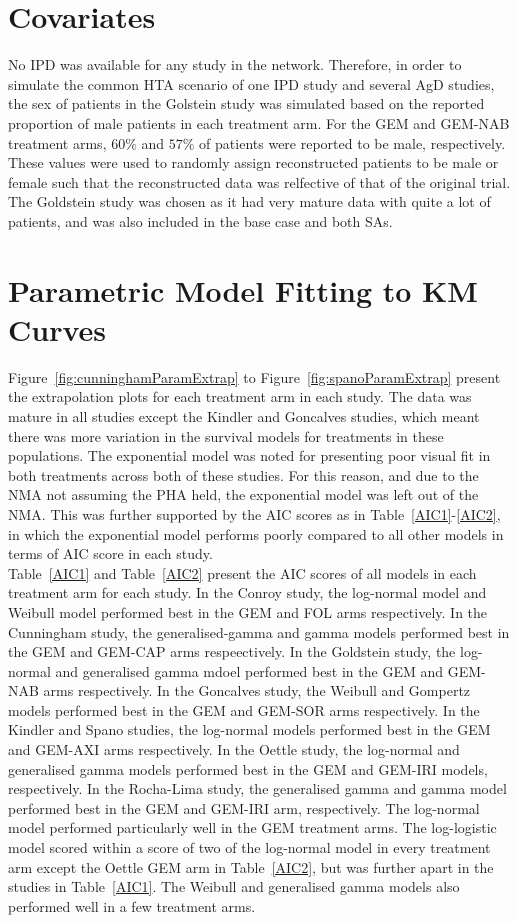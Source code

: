 \section{Covariates}
No IPD was available for any study in the network. Therefore, in order to simulate the common HTA scenario of one IPD study and several AgD studies, the sex of patients in the Golstein study was simulated based on the reported proportion of male patients in each treatment arm. For the GEM and GEM-NAB treatment arms, $60\%$ and $57\%$ of patients were reported to be male, respectively. These values were used to randomly assign reconstructed patients to be male or female such that the reconstructed data was relfective of that of the original trial. The Goldstein study was chosen as it had very mature data with quite a lot of patients, and was also included in the base case and both SAs. 

\section{Parametric Model Fitting to KM Curves}
Figure~\ref{fig:cunninghamParamExtrap} to Figure~\ref{fig:spanoParamExtrap} present the extrapolation plots for each treatment arm in each study. The data was mature in all studies except the Kindler and Goncalves studies, which meant there was more variation in the survival models for treatments in these populations. The exponential model was noted for presenting poor visual fit in both treatments across both of these studies. For this reason, and due to the NMA not assuming the PHA held, the exponential model was left out of the NMA. This was further supported by the AIC scores as in Table~\ref{AIC1}-\ref{AIC2}, in which the exponential model performs poorly compared to all other models in terms of AIC score in each study.\\

Table~\ref{AIC1} and Table~\ref{AIC2} present the AIC scores of all models in each treatment arm for each study. In the Conroy study, the log-normal model and Weibull model performed best in the GEM and FOL arms respectively. In the Cunningham study, the generalised-gamma and gamma models performed best in the GEM and GEM-CAP arms respeectively. In the Goldstein study, the log-normal and generalised gamma mdoel performed best in the GEM and GEM-NAB arms respectively. In the Goncalves study, the Weibull and Gompertz models performed best in the GEM and GEM-SOR arms respectively. In the Kindler and Spano studies, the log-normal models performed best in the GEM and GEM-AXI arms respectively. In the Oettle study, the log-normal and generalised gamma models performed best in the GEM and GEM-IRI models, respectively. In the Rocha-Lima study, the generalised gamma and gamma model performed best in the GEM and GEM-IRI arm, respectively. The log-normal model performed particularly well in the GEM treatment arms. The log-logistic model scored within a score of two of the log-normal model in every treatment arm except the Oettle GEM arm in Table~\ref{AIC2}, but was further apart in the studies in Table~\ref{AIC1}. The Weibull and generalised gamma models also performed well in a few treatment arms. \\

